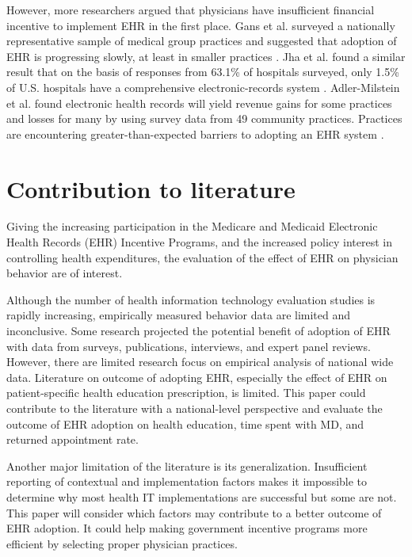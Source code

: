 \documentclass[12pt]{report}
\begin{document}
However, more researchers argued that physicians have insufficient financial incentive to implement EHR in the first place. Gans et al. surveyed a nationally representative sample of medical group practices and suggested that adoption of EHR is progressing slowly, at least in smaller practices \citep{Gans2005}. Jha et al. found a similar result that on the basis of responses from 63.1\% of hospitals surveyed, only 1.5\% of U.S. hospitals have a comprehensive electronic-records system \citep{Jha2009}. Adler-Milstein et al. found electronic health records will yield revenue gains for some practices and losses for many by using survey data from 49 community practices. Practices are encountering greater-than-expected barriers to adopting an EHR system \citep{Adler-Milstein2012}.

\section{Contribution to literature}

Giving the increasing participation in the Medicare and Medicaid Electronic Health Records (EHR) Incentive Programs, and the increased policy interest in controlling health expenditures, the evaluation of the effect of EHR on physician behavior are of interest.

Although the number of health information technology evaluation studies is rapidly increasing, empirically measured behavior data are limited and inconclusive. Some research projected the potential benefit of adoption of EHR with data from surveys, publications, interviews, and expert panel reviews. However, there are limited research focus on empirical analysis of national wide data. Literature on outcome of adopting EHR, especially the effect of EHR on patient-specific health education prescription, is limited. This paper could contribute to the literature with a national-level perspective and evaluate the outcome of EHR adoption on health education, time spent with MD, and returned appointment rate.

Another major limitation of the literature is its generalization. Insufficient reporting of contextual and implementation factors makes it impossible to determine why most health IT implementations are successful but some are not. This paper will consider which factors may contribute to a better outcome of EHR adoption. It could help making government incentive programs more efficient by selecting proper physician practices.



\newpage


\end{document}
